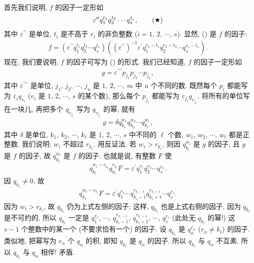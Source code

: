 \begin{pf}
    首先我们说明, $f$ 的因子一定形如
    \begin{align*}
        \varepsilon^{\prime \prime} q_1^{t_1} q_2^{t_2} \cdots q_s^{t_s}, \tag*{(\ding{72})}
    \end{align*}
    其中 $\varepsilon^{\prime \prime}$ 是单位, $t_i$ 是不高于 $r_i$ 的非负整数 ($i = 1$, $2$, $\cdots$, $s$). 显然, () 是 $f$ 的因子:
    \begin{align*}
        f = \left(\varepsilon^{\prime \prime} q_1^{t_1} q_2^{t_2} \cdots q_s^{t_s}\right) \left((\varepsilon^{\prime \prime})^{-1} \varepsilon^{\prime} q_1^{r_1 - t_1} q_2^{r_2 - t_2} \cdots q_s^{r_s - t_s}\right).
    \end{align*}
    现在, 我们要说明, $f$ 的因子可写为 () 的形式. 我们已经知道, $f$ 的因子一定形如
    \begin{align*}
        g = \varepsilon^{\prime \prime \prime} p_{j_1} p_{j_2} \cdots p_{j_u},
    \end{align*}
    其中 $\varepsilon^{\prime \prime \prime}$ 是单位, $j_1$, $j_2$, $\cdots$, $j_u$ 是 $1$, $2$, $\cdots$, $m$ 中 $u$ 个不同的数. 既然每个 $p_i$ 都能写为 $\varepsilon_i q_{v_i}$ ($v_i$ 是 $1$, $2$, $\cdots$, $s$ 的某个数), 那么每个 $p_{j_i}$ 都能写为 $\varepsilon_{j_i} q_{v_{j_i}}$. 将所有的单位写在一块儿, 再把多个 $q_{v_{j_i}}$ 写为 $q_{v_{j_i}}$ 的幂, 就有
    \begin{align*}
        g = \delta q_{k_1}^{w_1} q_{k_2}^{w_2} \cdots q_{k_\ell}^{w_\ell},
    \end{align*}
    其中 $\delta$ 是单位, $k_1$, $k_2$, $\cdots$, $k_\ell$ 是 $1$, $2$, $\cdots$, $s$ 中不同的 $\ell$ 个数, $w_1$, $w_2$, $\cdots$, $w_\ell$ 都是正整数. 我们说明: $w_i$ 不超过 $r_{k_i}$. 用反证法. 若 $w_i > r_{k_i}$, 则因 $q_{k_i}^{w_i}$ 是 $g$ 的因子, 且 $g$ 是 $f$ 的因子, 故 $q_{k_i}^{w_i}$ 是 $f$ 的因子. 也就是说, 有整数 $F$ 使
    \begin{align*}
        q_{k_i}^{w_i-r_{k_i}} q_{k_i}^{r_{k_i}} F = \varepsilon^{\prime} q_1^{r_1} q_2^{r_2} \cdots q_s^{r_s}.
    \end{align*}
    因 $q_{k_i} \neq 0$, 故
    \begin{align*}
        q_{k_i}^{w_i-r_{k_i}} F = \varepsilon^{\prime} q_1^{r_1} \cdots q_{k_i - 1}^{r_{k_i - 1}} q_{k_i + 1}^{r_{k_i + 1}} \cdots q_s^{r_s}.
    \end{align*}
    因为 $w_i > r_{k_i}$, 故 $q_{k_i}$ 仍为上式左侧的因子; 这样, $q_{k_i}$ 也是上式右侧的因子. 因为 $q_{k_i}$ 是不可约的, 所以 $q_{k_i}$ 一定是 $q_1^{r_1}$, $\cdots$, $q_{k_i - 1}^{r_{k_i - 1}}$, $q_{k_i + 1}^{r_{k_i + 1}}$, $\cdots$, $q_s^{r_s}$ (此处无 $q_{k_i}$ 的幂!) 这 $s-1$ 个整数中的某一个 (不要求恰有一个) 的因子. 设 $q_{k_i}$ 是 $q_\alpha^{r_\alpha}$ ($r_\alpha \neq k_i$) 的因子. 类似地, 把幂写为 $r_\alpha$ 个 $q_\alpha$ 的积, 即知 $q_{k_i}$ 是 $q_\alpha$ 的因子. 所以 $q_{k_i}$ 与 $q_\alpha$ 不互素. 所以 $q_{k_i}$ 与 $q_\alpha$ 相伴! 矛盾.


\end{pf}
